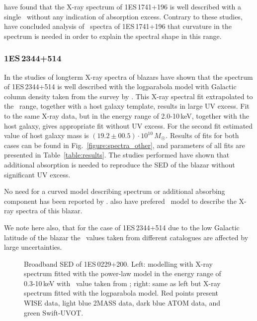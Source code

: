 \cite{MAGIC_1741} have found that the X-ray spectrum of 1ES\,1741+196 is well described with a single \po\ without any indication of absorption excess. 
Contrary to these studies, \cite{VERITAS_1741} have concluded analysis of \xrt\ spectra of 1ES\,1741+196 that curvature in the spectrum is needed in order to explain the spectral shape in this range.


\subsubsection*{1ES\,2344+514}
In the studies of longterm X-ray spectra of blazars \cite{Wierzcholska2016} have shown that the spectrum of 1ES\,2344+514 is well described with the logparabola model with Galactic column density taken from the survey by \cite{Kalberla2005}.
This X-ray spectral fit extrapolated to the \itu\ range, together with a host galaxy template, results in large UV excess. 
Fit to the same X-ray data, but in the energy range of 2.0-10\,keV, together with the host galaxy, gives appropriate fit without UV excess. 
For the second fit estimated value of  host galaxy mass is $(19.2\pm00.5)\cdot 10^{10} \,M_{\astrosun}$.
Results of fits for both cases can be found in Fig.~\ref{figure:spectra_other}, and parameters of all fits are presented in Table~\ref{table:results}. 
The studies performed have shown that additional absorption is needed to reproduce the SED of the blazar without significant UV excess. 

No need for a curved model describing spectrum or additional absorbing component has been reported by \cite{MAGIC_2344}.
\cite{Kapanadze_2344} also have  prefered \po\ model to describe the X-ray spectra of this blazar. 
 
  We note here also, that for the case of 1ES\,2344+514 due to the low Galactic latitude of the blazar the \nh\ values taken from different catalogues are affected by large uncertainties.
 
 
\begin{figure*}
\caption[]{Broadband SED of 1ES\,0229+200. Left: modelling with X-ray spectrum fitted with the power-law model in the energy range of 0.3-10\,keV with \nh\ value taken from \cite{Kalberla2005}; right: same as left but X-ray spectrum fitted with the logparabola model. 
Red points present WISE data, light blue 2MASS data, dark blue ATOM data, and green Swift-UVOT.}
\label{figure:spectra_global}
\end{figure*}

